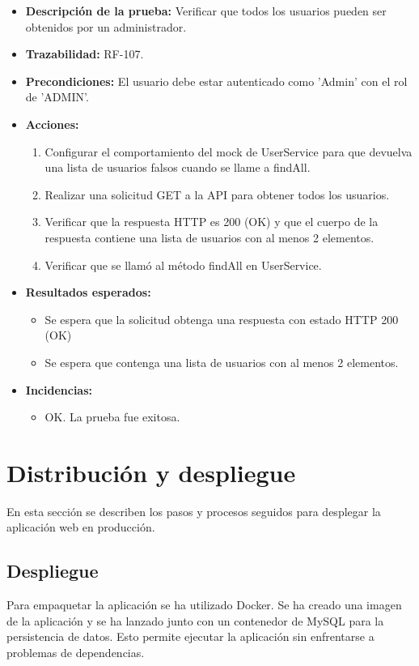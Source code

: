 \begin{itemize}
    \item \textbf{Descripción de la prueba:} Verificar que todos los usuarios pueden ser obtenidos por un administrador.
    \item \textbf{Trazabilidad:} RF-107.
    \item \textbf{Precondiciones:} El usuario debe estar autenticado como 'Admin' con el rol de 'ADMIN'.
    \item \textbf{Acciones:}
    \begin{enumerate}
        \item Configurar el comportamiento del mock de UserService para que devuelva una lista de usuarios falsos cuando se llame a findAll.
        \item Realizar una solicitud GET a la API para obtener todos los usuarios.
        \item Verificar que la respuesta HTTP es 200 (OK) y que el cuerpo de la respuesta contiene una lista de usuarios con al menos 2 elementos.
        \item Verificar que se llamó al método findAll en UserService.
    \end{enumerate}
    \item \textbf{Resultados esperados:}
    \begin{itemize}
        \item Se espera que la solicitud obtenga una respuesta con estado HTTP 200 (OK) 
        \item Se espera que contenga una lista de usuarios con al menos 2 elementos.
    \end{itemize}
    \item \textbf{Incidencias:}
    \begin{itemize}
        \item OK. La prueba fue exitosa.
    \end{itemize}
\end{itemize}

\section{Distribución y despliegue}
En esta sección se describen los pasos y procesos seguidos para desplegar la aplicación web en producción.
\subsection{Despliegue}
Para empaquetar la aplicación se ha utilizado Docker. Se ha creado una imagen de la aplicación y se ha lanzado junto con un contenedor de MySQL para la persistencia de datos.
Esto permite ejecutar la aplicación sin enfrentarse a problemas de dependencias.

